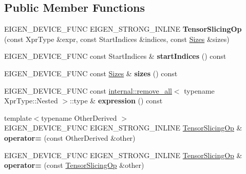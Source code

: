 \subsection*{Public Member Functions}
\begin{DoxyCompactItemize}
\item 
\mbox{\label{class_eigen_1_1_tensor_slicing_op_a553fdec5d47afb65af1da109d37ad15c}} 
E\+I\+G\+E\+N\+\_\+\+D\+E\+V\+I\+C\+E\+\_\+\+F\+U\+NC E\+I\+G\+E\+N\+\_\+\+S\+T\+R\+O\+N\+G\+\_\+\+I\+N\+L\+I\+NE {\bfseries Tensor\+Slicing\+Op} (const Xpr\+Type \&expr, const Start\+Indices \&indices, const \hyperlink{struct_eigen_1_1_sizes}{Sizes} \&sizes)
\item 
\mbox{\label{class_eigen_1_1_tensor_slicing_op_a8eb9494ec4343f151afe604ed65f701b}} 
E\+I\+G\+E\+N\+\_\+\+D\+E\+V\+I\+C\+E\+\_\+\+F\+U\+NC const Start\+Indices \& {\bfseries start\+Indices} () const
\item 
\mbox{\label{class_eigen_1_1_tensor_slicing_op_ad5b754499aeaad56edcc4df3e278cc96}} 
E\+I\+G\+E\+N\+\_\+\+D\+E\+V\+I\+C\+E\+\_\+\+F\+U\+NC const \hyperlink{struct_eigen_1_1_sizes}{Sizes} \& {\bfseries sizes} () const
\item 
\mbox{\label{class_eigen_1_1_tensor_slicing_op_aa82a735a298601f917d2974eead04186}} 
E\+I\+G\+E\+N\+\_\+\+D\+E\+V\+I\+C\+E\+\_\+\+F\+U\+NC const \hyperlink{struct_eigen_1_1internal_1_1remove__all}{internal\+::remove\+\_\+all}$<$ typename Xpr\+Type\+::\+Nested $>$\+::type \& {\bfseries expression} () const
\item 
\mbox{\label{class_eigen_1_1_tensor_slicing_op_acdeb081c43ef587ae236da0b1b1f2deb}} 
{\footnotesize template$<$typename Other\+Derived $>$ }\\E\+I\+G\+E\+N\+\_\+\+D\+E\+V\+I\+C\+E\+\_\+\+F\+U\+NC E\+I\+G\+E\+N\+\_\+\+S\+T\+R\+O\+N\+G\+\_\+\+I\+N\+L\+I\+NE \hyperlink{class_eigen_1_1_tensor_slicing_op}{Tensor\+Slicing\+Op} \& {\bfseries operator=} (const Other\+Derived \&other)
\item 
\mbox{\label{class_eigen_1_1_tensor_slicing_op_a1aefa7f4315b7b894507820b1d8ef474}} 
E\+I\+G\+E\+N\+\_\+\+D\+E\+V\+I\+C\+E\+\_\+\+F\+U\+NC E\+I\+G\+E\+N\+\_\+\+S\+T\+R\+O\+N\+G\+\_\+\+I\+N\+L\+I\+NE \hyperlink{class_eigen_1_1_tensor_slicing_op}{Tensor\+Slicing\+Op} \& {\bfseries operator=} (const \hyperlink{class_eigen_1_1_tensor_slicing_op}{Tensor\+Slicing\+Op} \&other)

\end{DoxyCompactItemize}
